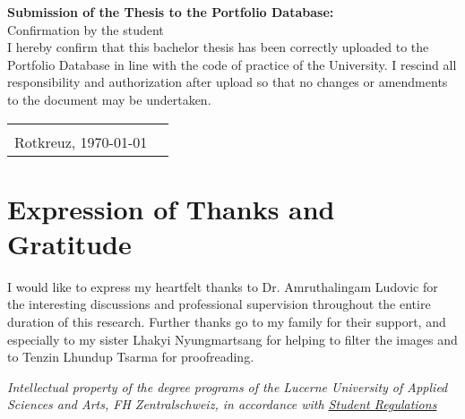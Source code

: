 \begin{titlepage}
\vspace{3em}
\noindent
\textbf{Submission of the Thesis to the Portfolio Database:}\\
Confirmation by the student\\
I hereby confirm that this bachelor thesis has been correctly uploaded to the Portfolio Database in line with the code of practice of the University. I rescind all responsibility and authorization after upload so that no changes or amendments to the document may be undertaken. \\
\begin{tabularx}{\textwidth}{@{}lX}
	&\\
	Rotkreuz, \today &  \\
	\cline{2-2}
\end{tabularx}

\chapter*{Expression of Thanks and Gratitude}
I would like to express my heartfelt thanks to Dr. Amruthalingam Ludovic for the interesting discussions and professional supervision throughout the entire duration of this research. Further thanks go to my family for their support, and especially to my sister Lhakyi Nyungmartsang for helping to filter the images and to Tenzin Lhundup Tsarma for proofreading.

\vspace*{\fill}
\noindent
\emph{Intellectual property of the degree programs of the Lucerne
University of Applied Sciences and Arts, FH Zentralschweiz, in
accordance with 
\href{https://srl.lu.ch/app/de/texts_of_law/521/versions/4065}{Student Regulations}}

\end{titlepage}

